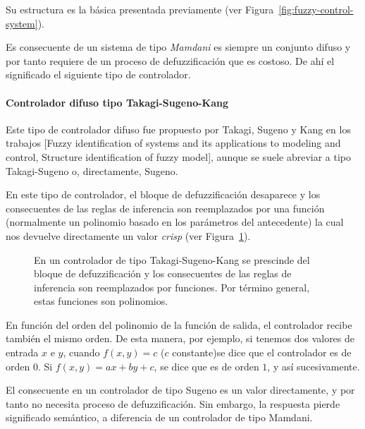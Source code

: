 Su estructura es la básica presentada previamente (ver Figura~\ref{fig:fuzzy-control-system}).

Es consecuente de un sistema de tipo \textit{Mamdani} es siempre un conjunto difuso y por tanto requiere de un proceso de defuzzificación que es costoso. De ahí el significado el siguiente tipo de controlador.

\paragraph{Controlador difuso tipo Takagi-Sugeno-Kang}

Este tipo de controlador difuso fue propuesto por Takagi, Sugeno y Kang en los trabajos [Fuzzy identification of systems and its applications to modeling and control, Structure identification of fuzzy model], aunque se suele abreviar a tipo Takagi-Sugeno o, directamente, Sugeno.

En este tipo de controlador, el bloque de defuzzificación desaparece y los consecuentes de las reglas de inferencia son reemplazados por una función (normalmente un polinomio basado en los parámetros del antecedente) la cual nos devuelve directamente un valor \textit{crisp} (ver Figura~\ref{fig:sugeno-type}).

\begin{figure}[!b]
	\centering
	\caption[Ejemplo de reglas en controlador Takagi-Sugeno]{En un controlador de tipo Takagi-Sugeno-Kang se prescinde del bloque de defuzzificación y los consecuentes de las reglas de inferencia son reemplazados por funciones. Por término general, estas funciones son polinomios.}
	\label{fig:sugeno-type}
\end{figure}

En función del orden del polinomio de la función de salida, el controlador recibe también el mismo orden. De esta manera, por ejemplo, si tenemos dos valores de entrada $x$ e $y$, cuando $f(x, y) = c$ ($c$ constante)se dice que el controlador es de orden $0$. Si $f(x, y) = ax + by + c$, se dice que es de orden $1$, y así sucesivamente.

El consecuente en un controlador de tipo Sugeno es un valor directamente, y por tanto no necesita proceso de defuzzificación. Sin embargo, la respuesta pierde significado semántico, a diferencia de un controlador de tipo Mamdani.

